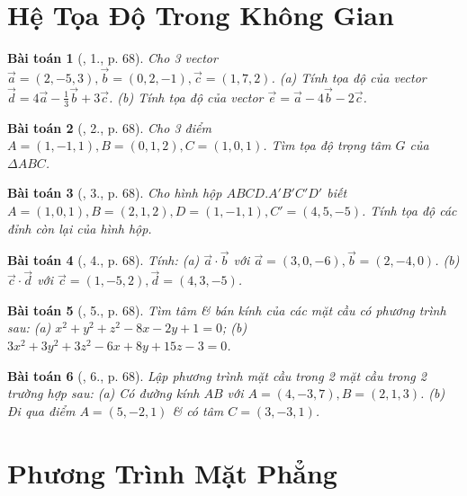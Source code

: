 \documentclass{article}
\newtheorem{baitoan}{Bài toán}
\begin{document}

\section{Hệ Tọa Độ Trong Không Gian}

\begin{baitoan}[\cite{SGK_Toan_12_hinh_hoc_co_ban}, 1., p. 68]
	Cho 3 vector $\vec{a} = (2,-5,3),\vec{b} = (0,2,-1),\vec{c} = (1,7,2)$. (a) Tính tọa độ của vector $\vec{d} = 4\vec{a} - \frac{1}{3}\vec{b} + 3\vec{c}$. (b) Tính tọa độ của vector $\vec{e} = \vec{a} - 4\vec{b} - 2\vec{c}$.
\end{baitoan}

\begin{baitoan}[\cite{SGK_Toan_12_hinh_hoc_co_ban}, 2., p. 68]
	Cho 3 điểm $A = (1,-1,1),B = (0,1,2),C = (1,0,1)$. Tìm tọa độ trọng tâm $G$ của $\Delta ABC$.
\end{baitoan}

\begin{baitoan}[\cite{SGK_Toan_12_hinh_hoc_co_ban}, 3., p. 68]
	Cho hình hộp $ABCD.A'B'C'D'$ biết $A = (1,0,1),B = (2,1,2),D = (1,-1,1),C' = (4,5,-5)$. Tính tọa độ các đỉnh còn lại của hình hộp.
\end{baitoan}

\begin{baitoan}[\cite{SGK_Toan_12_hinh_hoc_co_ban}, 4., p. 68]
	Tính: (a) $\vec{a}\cdot\vec{b}$ với $\vec{a} = (3,0,-6),\vec{b} = (2,-4,0)$. (b) $\vec{c}\cdot\vec{d}$ với $\vec{c} = (1,-5,2),\vec{d} = (4,3,-5)$.
\end{baitoan}

\begin{baitoan}[\cite{SGK_Toan_12_hinh_hoc_co_ban}, 5., p. 68]
	Tìm tâm \& bán kính của các mặt cầu có phương trình sau: (a) $x^2 + y^2 + z^2 - 8x - 2y + 1 = 0$; (b) $3x^2 + 3y^2 + 3z^2 - 6x + 8y + 15z - 3 = 0$.
\end{baitoan}

\begin{baitoan}[\cite{SGK_Toan_12_hinh_hoc_co_ban}, 6., p. 68]
	Lập phương trình mặt cầu trong 2 mặt cầu trong 2 trường hợp sau: (a) Có đường kính $AB$ với $A = (4,-3,7),B = (2,1,3)$. (b) Đi qua điểm $A = (5,-2,1)$ \& có tâm $C = (3,-3,1)$.
\end{baitoan}


\section{Phương Trình Mặt Phẳng}
\end{document}

